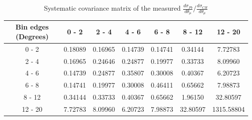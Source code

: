 \documentclass[aps,prl,twocolumn,superscriptaddress,nofootinbib]{revtex4-1}
\begin{document}
\begin{table}[h!]
  \centering
  \caption{Systematic covariance matrix of the measured $\frac{d\sigma_{Pb}}{d\theta_{\mu}}/\frac{d\sigma_{CH}}{d\theta_{\mu}}$}
    \begin{tabular}{c||cccccc}
      Bin edges (Degrees) & 0 - 2 & 2 - 4 & 4 - 6 & 6 - 8 & 8 - 12 & 12 - 20 \\
\hline \hline
        0 - 2 &  0.18089 &  0.16965 &  0.14739 &  0.14741 &  0.34144 &  7.72783 \\
        2 - 4 &  0.16965 &  0.24646 &  0.24877 &  0.19977 &  0.33733 &  8.09960 \\
        4 - 6 &  0.14739 &  0.24877 &  0.35807 &  0.30008 &  0.40367 &  6.20723 \\
        6 - 8 &  0.14741 &  0.19977 &  0.30008 &  0.46411 &  0.65662 &  7.98873 \\
       8 - 12 &  0.34144 &  0.33733 &  0.40367 &  0.65662 &  1.96150 & 32.80597 \\
      12 - 20 &  7.72783 &  8.09960 &  6.20723 &  7.98873 & 32.80597 & 1315.58804 \\
    \end{tabular}
  \label{tablecov:Pb_Systematic_ThetaMu}
\end{table}
\end{document}
